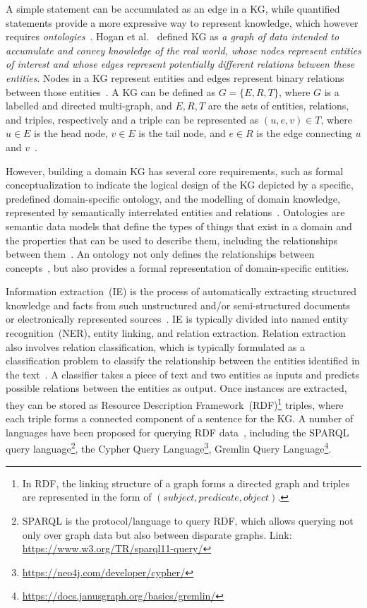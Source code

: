 \documentclass[10pt,journal,compsoc]{IEEEtran}
\begin{document}
A simple statement can be accumulated as an edge in a KG, while quantified statements provide a more expressive way to represent knowledge, which however requires \textit{ontologies}~\cite{hogan2020knowledge}. Hogan et al.~\cite{hogan2020knowledge} defined KG as \textit{a graph of data intended to accumulate and convey knowledge of the real world, whose nodes represent entities of interest and whose edges represent potentially different relations between these entities}. Nodes in a KG represent entities and edges represent binary relations between those entities~\cite{hogan2020knowledge}. A KG can be defined as $G=\{E,R,T\}$, where $G$ is a labelled and directed multi-graph, and $E, R, T$ are the sets of entities, relations, and triples, respectively and a triple can be represented as $(u,e,v) \in T$, where $u \in E$ is the head node, $v \in E$ is the tail node, and $e \in R$ is the edge connecting $u$ and $v$~\cite{hogan2020knowledge}. 

However, building a domain KG has several core requirements, such as formal conceptualization to indicate the logical design of the KG depicted by a specific, predefined domain-specific ontology, and the modelling of domain knowledge, represented by semantically interrelated entities and relations~\cite{abu2020domain}. Ontologies are semantic data models that define the types of things that exist in a domain and the properties that can be used to describe them, including the relationships between them~\cite{hogan2020knowledge}. An ontology not only defines the relationships between concepts~\cite{hitzler2009foundations}, but also provides a formal representation of domain-specific entities\cite{alirezaie2019semantic}. %

Information extraction~(IE) is the process of automatically extracting structured knowledge and facts from such unstructured and/or semi-structured documents or electronically represented sources~\cite{Liddy.2001}. IE is typically divided into named entity recognition~(NER), entity linking, and relation extraction. Relation extraction also involves relation classification, which is typically formulated as a classification problem to classify the relationship between the entities identified in the text~\cite{xue2019fine}. A classifier takes a piece of text and two entities as inputs and predicts possible relations between the entities as output. Once instances are extracted, they can be stored as Resource Description Framework~(RDF)\footnote{In RDF, the linking structure of a graph forms a directed graph and triples are represented in the form of $(subject,predicate,object)$.} triples, where each triple forms a connected component of a sentence for the KG. A number of languages have been proposed for querying RDF data~\cite{hogan2020knowledge}, including the SPARQL query language\footnote{SPARQL is the protocol/language to query RDF, which allows querying not only over graph data but also between disparate graphs. Link: \url{https://www.w3.org/TR/sparql11-query/}}, the Cypher Query Language\footnote{\url{https://neo4j.com/developer/cypher/}}, Gremlin Query Language\footnote{\url{https://docs.janusgraph.org/basics/gremlin/}}. 
\end{document}
